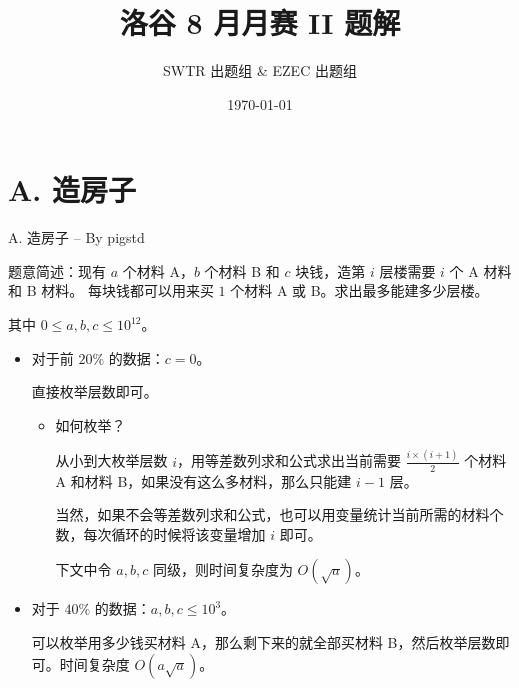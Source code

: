 \documentclass[10pt,aspectratio=43,mathserif]{beamer}
\title{洛谷 8 月月赛 II 题解}
\author{SWTR 出题组 \& EZEC 出题组}
\date{\today}
\begin{document}

\frame{\titlepage}

\section{}
\begin{frame}
  \tableofcontents
\end{frame}


\section{A. 造房子}

\begin{frame} \setlength{\parskip}{0.4\baselineskip}

	{\large A. 造房子 -- By pigstd}

	题意简述：现有 $a$ 个材料 A，$b$ 个材料 B 和 $c$ 块钱，造第 $i$ 层楼需要 $i$ 个 A 材料和 B 材料。 每块钱都可以用来买 $1$ 个材料 A 或 B。求出最多能建多少层楼。

	其中 $0\leq a,b,c\leq 10^{12}$。

\end{frame}

\begin{frame}

	\begin{itemize} \setlength{\parskip}{0.4\baselineskip}

		\item 对于前 $20\%$ 的数据：$c=0$。

		直接枚举层数即可。

		\begin{itemize} \setlength{\parskip}{0.4\baselineskip}

			\item 如何枚举？

			从小到大枚举层数 $i$，用等差数列求和公式求出当前需要 $\frac{i\times(i+1)}{2}$ 个材料 A 和材料 B，如果没有这么多材料，那么只能建 $i-1$ 层。

			当然，如果不会等差数列求和公式，也可以用变量统计当前所需的材料个数，每次循环的时候将该变量增加 $i$ 即可。

			下文中令 $a,b,c$ 同级，则时间复杂度为 $O(\sqrt{a})$。

		\end{itemize}

		\item 对于 $40\%$ 的数据：$a,b,c\leq 10^3$。

		可以枚举用多少钱买材料 A，那么剩下来的就全部买材料 B，然后枚举层数即可。时间复杂度 $O(a\sqrt{a})$。


	\end{itemize}

\end{frame}
\end{document}
